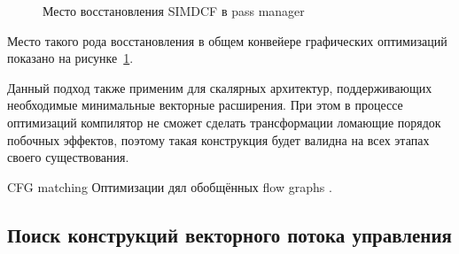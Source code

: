 \begin{figure}[ht]
    \caption{Место восстановления SIMDCF в pass manager}\label{fig:simdcf-gen}
\end{figure}

Место такого рода восстановления в общем конвейере графических оптимизаций показано на рисунке~\cref{fig:simdcf-gen}.

Данный подход также применим для скалярных архитектур, поддерживающих необходимые минимальные векторные расширения. При этом в процессе оптимизаций компилятор не сможет сделать трансформации ломающие порядок побочных эффектов, поэтому такая конструкция будет валидна на всех этапах своего существования.

CFG matching \cite{matoussi2019loop}
Оптимизации дял обобщённых flow graphs \cite{mansky2016specifying}.

\subsection{Поиск конструкций векторного потока управления}\label{sec:lowering/simdcf/optimization}

